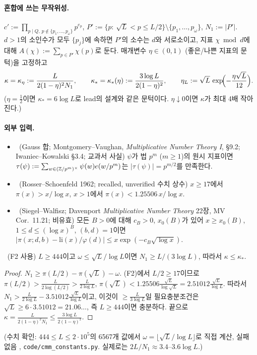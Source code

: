 \paragraph{혼합에 쓰는 무작위성.}
$c':=\prod_{p\mid Q,\ p\notin\{p_1,\dots,p_\omega\}}p^{e_p}$,
$P':=\{p:\ \sqrt L<p\le L/2\}\setminus\{p_1,\dots,p_\omega\}$, $N_1:=|P'|$.
$d>1$의 소인수가 모두 $\{p_j\}$에 속하면 $P'$의 소수는 $d$와 서로소이고, 지표 $\chi \bmod d$에 대해
$A(\chi):=\sum_{p\in P'}\chi(p)$로 둔다. 매개변수 $\eta\in(0,1)$ (좋은/나쁜 지표의 문턱)을 고정하고
\[
\kappa=\kappa_\eta:=\frac{L}{2(1-\eta)^2N_1},\qquad \kappa_*=\kappa_*(\eta):=\frac{3\log L}{2(1-\eta)^2},\qquad
\eta_L:=\sqrt L\,\exp\!\Bigl(-\frac{\eta\sqrt L}{12}\Bigr).
\]
($\eta=\frac12$이면 $\kappa_*=6\log L$로 lead의 설계와 같은 문턱이다. $\eta\downarrow0$이면 $\kappa$가 최대 4배 작아진다.)

\paragraph{외부 입력.}
\begin{itemize}[leftmargin=1.5em]
\item[(F1)] \EXT\ (Gauss 합; Montgomery--Vaughan, \emph{Multiplicative Number Theory I}, \S9.2; Iwaniec--Kowalski \S3.4; 교과서 사실)
 $\psi$가 법 $p^m$ ($m\ge1$)의 원시 지표이면 $\tau(\psi):=\sum_{w\in(\mathbb{Z}/p^m)^\times}\psi(w)e(w/p^m)$는 $|\tau(\psi)|=p^{m/2}$를 만족한다.
\item[(F2)] \EXT\ (Rosser--Schoenfeld 1962; recalled, unverified 수치 상수) $x\ge17$에서 $\pi(x)>x/\log x$, $x>1$에서 $\pi(x)<1.25506\,x/\log x$.
\item[(F3)] \EXT\ (Siegel--Walfisz; Davenport \emph{Multiplicative Number Theory} 22장, MV Cor.~11.21; 비유효)
 모든 $B>0$에 대해 $c_B>0$, $x_0(B)$가 있어 $x\ge x_0(B)$, $1\le d\le(\log x)^B$, $(b,d)=1$이면
 $|\pi(x;d,b)-\mathrm{li}(x)/\varphi(d)|\le x\exp(-c_B\sqrt{\log x})$.
\end{itemize}

\begin{lemma}[$N_1$의 하한]\label{CMM:lem-N1}
\PROVED\ (F2 사용) $L\ge444$이고 $\omega\le\sqrt L/\log L$이면 $N_1\ge L/(3\log L)$, 따라서 $\kappa\le\kappa_*$.
\end{lemma}
\begin{proof}
$N_1\ge\pi(L/2)-\pi(\sqrt L)-\omega$. (F2)에서 $L/2\ge17$이므로
$\pi(L/2)>\frac{L}{2\log(L/2)}>\frac{L}{2\log L}$, $\pi(\sqrt L)<1.25506\frac{\sqrt L}{\log\sqrt L}=2.51012\frac{\sqrt L}{\log L}$.
따라서 $N_1>\frac{L}{2\log L}-3.51012\frac{\sqrt L}{\log L}$이고, 이것이 $\ge\frac{L}{3\log L}$일 필요충분조건은
$\sqrt L\ge 6\cdot3.51012=21.06\ldots$, 즉 $L\ge 444$이면 충분하다. 끝으로 $\kappa=\frac{L}{2(1-\eta)^2N_1}\le\frac{3\log L}{2(1-\eta)^2}$.
\end{proof}
(수치 확인: $444\le L\le2\cdot10^5$의 6567개 값에서 $\omega=\lfloor\sqrt L/\log L\rfloor$로 직접 계산, 실패 없음 \NUMERIC,
\texttt{code/cmm\_constants.py}. 실제로는 $2L/N_1\approx3.4\text{--}3.6\log L$.)

